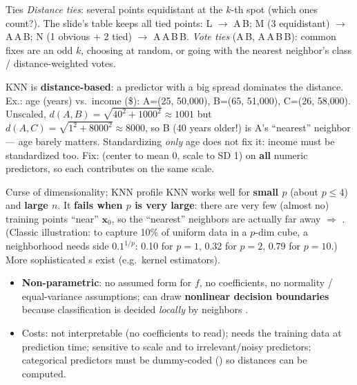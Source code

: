 \begin{topic}{Ties }
\emph{Distance ties}: several points equidistant at the $k$-th spot (which ones count?). The slide's table keeps all tied points: L $\to$ A\,B; M (3 equidistant) $\to$ A\,A\,B; N (1 obvious + 2 tied) $\to$ A\,A\,B\,B. \emph{Vote ties} (A\,B, A\,A\,B\,B): common fixes are an odd $k$, choosing at random, or going with the nearest neighbor's class / distance-weighted votes.
\end{topic}

\begin{keybox}
KNN is \textbf{distance-based}: a predictor with a big spread dominates the distance. Ex.: age (years) vs.\ income (\$): A=(25, 50{,}000), B=(65, 51{,}000), C=(26, 58{,}000). Unscaled, $d(A,B)=\sqrt{40^2+1000^2}\approx1001$ but $d(A,C)=\sqrt{1^2+8000^2}\approx8000$, so B (40 years older!) is A's ``nearest'' neighbor --- age barely matters. Standardizing \emph{only} age does not fix it: income must be standardized too.
Fix:  (center to mean 0, scale to SD 1) on \textbf{all} numeric predictors, so each contributes on the same scale.
\end{keybox}

\begin{topic}{Curse of dimensionality; KNN profile }
KNN works well for \textbf{small $p$} (about $p\le4$) and \textbf{large $n$}. It \textbf{fails when $p$ is very large}: there are very few (almost no) training points ``near'' $\mathbf x_0$, so the ``nearest'' neighbors are actually far away $\Rightarrow$ \textbf{}. (Classic illustration: to capture 10\% of uniform data in a $p$-dim cube, a neighborhood needs side $0.1^{1/p}$: 0.10 for $p=1$, 0.32 for $p=2$, 0.79 for $p=10$.) More sophisticated s exist (e.g.\ kernel estimators).
\begin{itemize}
\item \textbf{Non-parametric}: no assumed form for $f$, no coefficients, no normality / equal-variance assumptions; can draw \textbf{nonlinear decision boundaries} because classification is decided \emph{locally} by neighbors .
\item Costs: not interpretable (no coefficients to read); needs the training data at prediction time; sensitive to scale and to irrelevant/noisy predictors; categorical predictors must be dummy-coded () so distances can be computed.
\end{itemize}
\end{topic}

